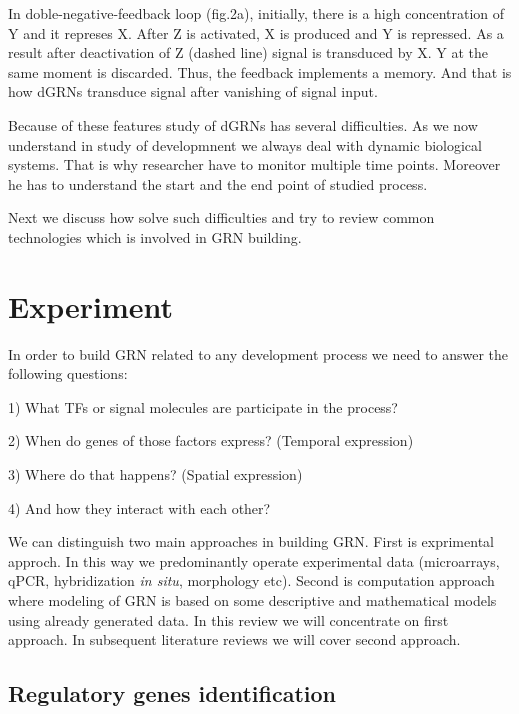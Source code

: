 \documentclass[a4paper, oneside]{report}
\begin{document}
In doble-negative-feedback loop (fig.2a), initially, there is a high concentration of Y and it represes X.
After Z is activated, X is produced and Y is repressed.
As a result after deactivation of Z (dashed line) signal is transduced by X.
Y at the same moment is discarded.
Thus, the feedback implements a memory.
And that is how dGRNs transduce signal after vanishing of signal input.

Because of these features study of dGRNs has several difficulties.
As we now understand in study of developmnent we always deal with dynamic biological systems.
That is why researcher have to monitor multiple time points.
Moreover he has to understand the start and the end point of studied process.

Next we discuss how solve such difficulties and try to review common technologies which is involved in GRN building.   

\section*{Experiment}

In order to build GRN related to any development process we need to answer the following questions:

\vspace{2mm}

1) What TFs or signal molecules are participate in the process? 

2) When do genes of those factors express? (Temporal expression)

3) Where do that happens? (Spatial expression)

4) And how they interact with each other?

\vspace{2mm}

We can distinguish two main approaches in building GRN. 
First is exprimental approch. In this way we predominantly operate experimental data (microarrays, qPCR, hybridization \textit{in situ}, morphology etc). 
Second is computation approach where modeling of GRN is based on some descriptive and mathematical models using already generated data. 
In this review we will concentrate on first approach. In subsequent literature reviews we will cover second approach.

\subsection*{Regulatory genes identification}
\end{document}
